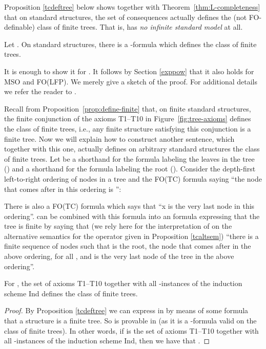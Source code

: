 \documentclass{LMCS}
\newcommand{\fo}{\textsf{FO}\xspace}
\newcommand{\mso}{\textsf{MSO}\xspace}
\newcommand{\fotc}{\textsf{FO(TC)}\xspace}
\newcommand{\folfp}{\textsf{FO(LFP)}\xspace}
\begin{document}
Proposition \ref{tcdeftree} below shows together with Theorem~\ref{thm:L-completeness} that on standard structures, the set of  consequences actually defines the (not \fo-definable) class of finite trees. That is,  has \emph{no infinite standard model} at all.

\begin{prop}[\cite{2006}]
Let . On standard structures, there is a -formula which defines the class of finite trees.
\label{tcdeftree}
\end{prop}
It is enough to show it for . It follows by Section \ref{exppow} that it also holds for \mso and \folfp.
We merely give a sketch of the proof. For additional details we
refer the reader to \cite{2006}. 

Recall from Proposition~\ref{prop:define-finite} that, on finite standard
structures, the finite conjunction of the axioms T1--T10 in
Figure~\ref{fig:tree-axioms} defines the class of
finite trees, i.e., any finite structure satisfying this
conjunction is a finite tree. Now we will explain how to construct
another sentence, which together with this one, actually defines
on arbitrary standard structures the class of finite trees. Let
 be a shorthand for the formula labeling the leaves in the
tree () and  a
shorthand for the formula labeling the root (). Consider the
depth-first left-to-right ordering of nodes in a tree and the
\fotc formula  saying ``the node that comes after
 in this ordering is '':
\begin{center}

\end{center}
There is also a \fotc formula which says that ``x is the very last
node in this ordering''.  can be combined with this
formula into an  formula  expressing that the tree is
finite by saying that (we rely here for the interpretation of
 on the alternative semantics for the  operator given in
Proposition \ref{tcaltsem}) ``there is a finite sequence of nodes
 such that  is the root,  the node
that comes after  in the above ordering, for all , and
 is the very last node of the tree in the above ordering''.



\begin{thm}\label{thm:define}
For , the set of axioms T1--T10 together
with all -instances of the induction scheme Ind defines the
class of finite trees.
\end{thm}

\begin{proof}
By Proposition \ref{tcdeftree} we can express in  by means of some formula  that a structure is a finite tree. So 
is provable in  (as it is a -formula
valid on the class of finite trees). In other words, if  is
the set of axioms T1--T10 together
with all -instances of the induction scheme Ind, then we have 
that .
\end{proof}
\end{document}

